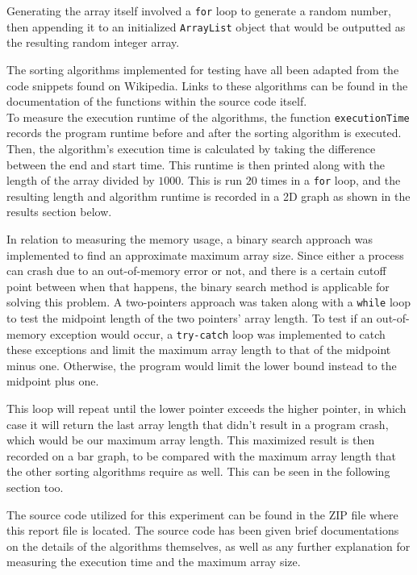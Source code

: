 \documentclass{report}
\begin{document}
Generating the array itself involved a \lstinline|for| loop to generate a random number, then appending it to an initialized \lstinline|ArrayList| object that would be outputted as the resulting random integer array.

The sorting algorithms implemented for testing have all been adapted from the code snippets found on Wikipedia. Links to these algorithms can be found in the documentation of the functions within the source code itself. \\

To measure the execution runtime of the algorithms, the function \lstinline|executionTime| records the program runtime before and after the sorting algorithm is executed. Then, the algorithm's execution time is calculated by taking the difference between the end and start time. This runtime is then printed along with the length of the array divided by $1000$. This is run $20$ times in a \lstinline|for| loop, and the resulting length and algorithm runtime is recorded in a 2D graph as shown in the results section below.

In relation to measuring the memory usage, a binary search approach was implemented to find an approximate maximum array size. Since either a process can crash due to an out-of-memory error or not, and there is a certain cutoff point between when that happens, the binary search method is applicable for solving this problem. A two-pointers approach was taken along with a \lstinline|while| loop to test the midpoint length of the two pointers' array length. To test if an out-of-memory exception would occur, a \lstinline|try-catch| loop was implemented to catch these exceptions and limit the maximum array length to that of the midpoint minus one. Otherwise, the program would limit the lower bound instead to the midpoint plus one.

This loop will repeat until the lower pointer exceeds the higher pointer, in which case it will return the last array length that didn't result in a program crash, which would be our maximum array length. This maximized result is then recorded on a bar graph, to be compared with the maximum array length that the other sorting algorithms require as well. This can be seen in the following section too.

The source code utilized for this experiment can be found in the ZIP file where this report file is located. The source code has been given brief documentations on the details of the algorithms themselves, as well as any further explanation for measuring the execution time and the maximum array size.
\end{document}

